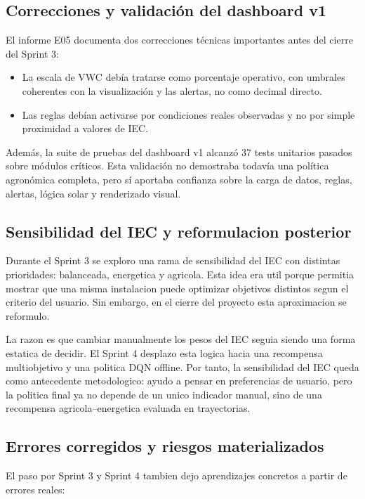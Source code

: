 ﻿\documentclass[11pt,a4paper]{article}
\begin{document}
\subsection{Correcciones y validación del dashboard v1}

El informe E05 documenta dos correcciones técnicas importantes antes del cierre del Sprint 3:

\begin{itemize}
    \item La escala de VWC debía tratarse como porcentaje operativo, con umbrales coherentes con la visualización y las alertas, no como decimal directo.
    \item Las reglas debían activarse por condiciones reales observadas y no por simple proximidad a valores de IEC.
\end{itemize}

Además, la suite de pruebas del dashboard v1 alcanzó 37 tests unitarios pasados sobre módulos críticos. Esta validación no demostraba todavía una política agronómica completa, pero sí aportaba confianza sobre la carga de datos, reglas, alertas, lógica solar y renderizado visual.

\subsection{Sensibilidad del IEC y reformulacion posterior}

Durante el Sprint 3 se exploro una rama de sensibilidad del IEC con distintas prioridades: balanceada, energetica y agricola. Esta idea era util porque permitia mostrar que una misma instalacion puede optimizar objetivos distintos segun el criterio del usuario. Sin embargo, en el cierre del proyecto esta aproximacion se reformulo.

La razon es que cambiar manualmente los pesos del IEC seguia siendo una forma estatica de decidir. El Sprint 4 desplazo esta logica hacia una recompensa multiobjetivo y una politica DQN offline. Por tanto, la sensibilidad del IEC queda como antecedente metodologico: ayudo a pensar en preferencias de usuario, pero la politica final ya no depende de un unico indicador manual, sino de una recompensa agricola--energetica evaluada en trayectorias.

\subsection{Errores corregidos y riesgos materializados}

El paso por Sprint 3 y Sprint 4 tambien dejo aprendizajes concretos a partir de errores reales:
\end{document}
